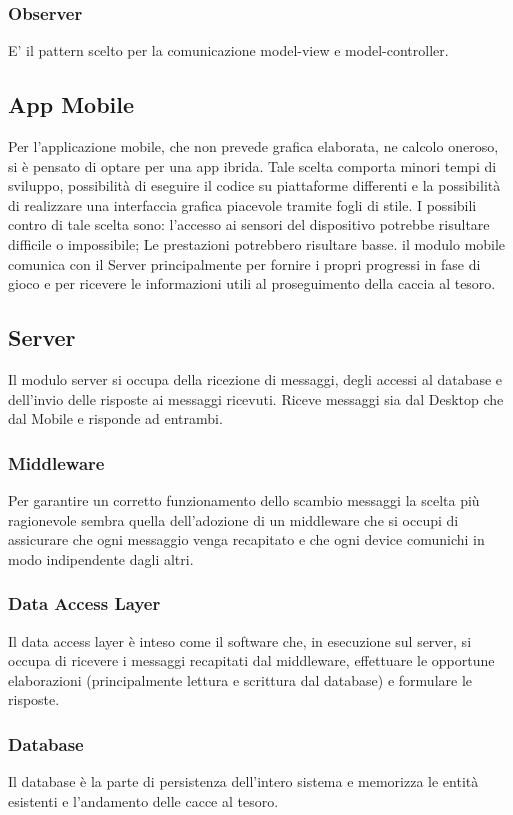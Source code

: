 \documentclass[12pt, italian]{article}
\begin{document}
\subsubsection*{Observer}
E' il pattern scelto per la comunicazione model-view e model-controller.

\subsection{App Mobile}
Per l'applicazione mobile, che non prevede grafica elaborata, ne calcolo oneroso, si è pensato di optare per una app ibrida.
Tale scelta comporta minori tempi di sviluppo, possibilità di eseguire il codice su piattaforme differenti e la possibilità di realizzare una interfaccia grafica piacevole tramite fogli di stile.
I possibili contro di tale scelta sono: l'accesso ai sensori del dispositivo potrebbe risultare difficile o impossibile; Le prestazioni potrebbero risultare basse.
il modulo mobile comunica con il Server principalmente per fornire i propri progressi in fase di gioco e per ricevere le informazioni utili al proseguimento della caccia al tesoro.

\subsection{Server}
Il modulo server si occupa della ricezione di messaggi, degli accessi al database e dell'invio delle risposte ai messaggi ricevuti. Riceve messaggi sia dal Desktop che dal Mobile e risponde ad entrambi.
\subsubsection{Middleware}
Per garantire un corretto funzionamento dello scambio messaggi la scelta più ragionevole sembra quella dell'adozione di un middleware che si occupi di assicurare che ogni messaggio venga recapitato e che ogni device comunichi in modo indipendente dagli altri.
\subsubsection{Data Access Layer}
Il data access layer è inteso come il software che, in esecuzione sul server, si occupa di ricevere i messaggi recapitati dal middleware, effettuare le opportune elaborazioni (principalmente lettura e scrittura dal database) e formulare le risposte.
\subsubsection{Database}
Il database è la parte di persistenza dell'intero sistema e memorizza le entità esistenti e l'andamento delle cacce al tesoro.
\end{document}
